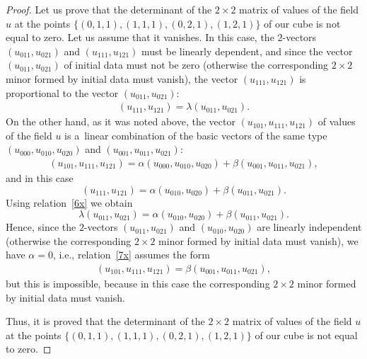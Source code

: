 \documentclass[11pt]{article}
\begin{document}
\begin{proof}
Let us prove that the determinant of the $2 \times 2$ matrix of
values of the f\/ield $u$ at the points $\{(0, 1, 1), (1, 1, 1), (0,
2, 1), (1, 2, 1)\}$ of our cube is not equal to zero. Let us assume
that it va\-nishes. In this case, the $2$-vectors $(u_{0 1 1}, u_{0 2
1})$ and $(u_{1 1 1}, u_{1 2 1})$ must be linearly dependent, and
since the vector $(u_{0 1 1}, u_{0 2 1})$ of initial data must not
be zero (otherwise the corresponding $2 \times 2$ minor formed by
initial data must vanish), the vector $(u_{1 1 1}, u_{1 2 1})$ is
proportional to the vector $(u_{0 1 1}, u_{0 2 1})$: \begin{gather} (u_{1 1 1},
u_{1 2 1}) = \lambda (u_{0 1 1}, u_{0 2 1}). \label{6x} \end{gather} On the
other hand, as it was noted above, the vector $(u_{1 0 1}, u_{1 1
1}, u_{1 2 1})$ of values of the f\/ield $u$ is a~linear combination
of the basic vectors of the same type $(u_{0 0 0}, u_{0 1 0}, u_{0 2
0})$ and $(u_{0 0 1}, u_{0 1 1}, u_{0 2 1})$:
\begin{gather}
(u_{1 0 1}, u_{1 1 1}, u_{1 2 1}) = \alpha (u_{0 0 0}, u_{0 1
0}, u_{0 2 0}) + \beta (u_{0 0 1}, u_{0 1 1}, u_{0 2 1}),
\label{7x}
\end{gather}
and in this case \[ (u_{1 1 1}, u_{1 2 1}) = \alpha (u_{0 1 0},
u_{0 2 0}) + \beta (u_{0 1 1}, u_{0 2 1}). \] Using relation~\eqref{6x}
we obtain \[ \lambda (u_{0 1 1}, u_{0 2 1}) = \alpha
(u_{0 1 0}, u_{0 2 0}) + \beta (u_{0 1 1}, u_{0 2 1}). \] Hence,
since the $2$-vectors $(u_{0 1 1}, u_{0 2 1})$ and $(u_{0 1 0}, u_{0
2 0})$ are linearly independent (otherwise the corresponding $2
\times 2$ minor formed by initial data must vanish), we have $\alpha
= 0$, i.e., relation~\eqref{7x} assumes the form
\begin{gather*} (u_{1 0 1},
u_{1 1 1}, u_{1 2 1}) = \beta (u_{0 0 1}, u_{0 1 1}, u_{0 2 1}),
\end{gather*}
but this is impossible, because in this case the
corresponding $2 \times 2$ minor formed by initial data must vanish.


Thus, it is proved that the determinant of the $2 \times 2$ matrix
of values of the f\/ield $u$ at the points $\{(0, 1, 1), (1, 1, 1),
(0, 2, 1), (1, 2, 1)\}$ of our cube is not equal to zero.





\end{proof}
\end{document}
